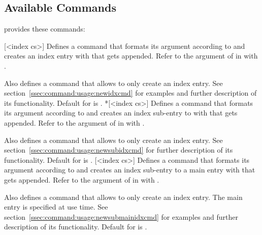 \documentclass{cnpkgdoc}
\begin{document}
\subsection{Available Commands}
\idxcmds provides these commands:
\begin{beschreibung}
  [<index cs>]{}\newline
    Defines a command  that formats its argument according to
     and creates an index entry with 
    that gets  appended.  Refer to the argument of 
    in  with .
    
    Also defines a command  that allows to only create an index
    entry.  See section~\ref{ssec:command:usage:newidxcmd} for examples and
    further description of its functionality.  Default for  is
    .
  *[<index cs>]{}\newline
    Defines a command  that formats its argument according to
     and creates an index sub-entry to  with  that gets 
    appended.  Refer to the argument of  in 
    with .
    
    Also defines a command  that allows to only create an index
    entry.  See section~\ref{ssec:command:usage:newsubidxcmd} for further
    description of its functionality. Default for  is
    .
  [<index cs>]{}\newline
    Defines a command  that formats its argument according to
     and creates an index sub-entry to a main entry with
     that gets  appended.  Refer to
    the argument of  in  with .
    
    Also defines a command  that allows to only create an index
    entry.  The main entry is specified at use time. See
    section~\ref{ssec:command:usage:newsubmainidxcmd} for examples and further 
    description of its functionality. Default for  is
    .
\end{beschreibung}
\end{document}
